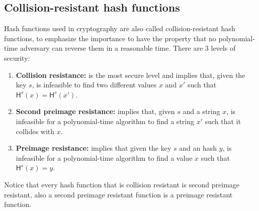 \subsection{Collision-resistant hash functions}\label{sec:collisionresistant}
Hash functions used in cryptography are also called collision-resistant hash functions, to emphasize the importance to have the property that no polynomial-time adversary can reverse them in a reasonable time.
There are 3 levels of security:
\begin{enumerate}
    \item{\textbf{Collision resistance:} is the most secure level and implies that, given the key $s$, is infeasible to find two different values $x$ and $x'$ such that $\mathsf{H}^s(x) = \mathsf{H}^s(x')$.}
    \item{\textbf{Second preimage resistance:} implies that, given $s$ and a string $x$, is infeasible for a polynomial-time algorithm to find a string $x'$ such that it collides with $x$.}
    \item{\textbf{Preimage resistance:} implies that given the key $s$ and an hash $y$, is infeasible for a polynomial-time algorithm to find a value $x$ such that $\mathsf{H}^s(x) = y$.}
\end{enumerate}
Notice that every hash function that is collision resistant is second preimage resistant, also a second preimage resistant function is a preimage resistant function.

